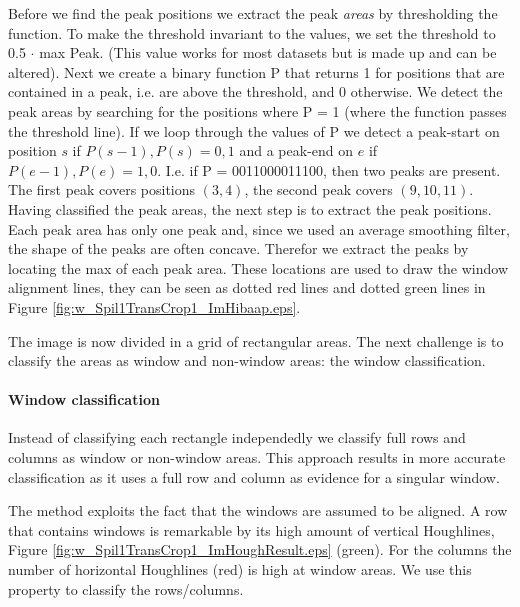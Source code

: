 Before we find the peak positions we extract the peak \emph{areas} by thresholding the
function. To make the threshold invariant to the values, we set the threshold to 0.5 $\cdot$ max Peak. 
(This value works for most datasets but is made up and can be altered).
Next we create a binary function P that returns 1 for positions that are contained in
a peak, i.e. are above the threshold, and 0 otherwise.
We detect the peak areas by searching for the positions where P = 1
(where the function passes the threshold line). 
If we loop through the values of P we detect a peak-start on position $s$ if ${P(s-1),P(s)}={0,1}$
and a peak-end on $e$ if ${P(e-1),P(e)}={1,0}$. 
I.e. if P = 0011000011100, then two peaks are present. The first peak covers positions $(3,4)$, 
the second peak covers $(9,10,11)$.\\

Having classified the peak areas, the next step is to extract the peak positions. 
Each peak area has only one peak and, since we used an average smoothing filter, the shape of 
the peaks are often concave. Therefor we extract the peaks by locating the max of each peak area. 
These locations are used to draw the window alignment lines, they can be seen
as dotted red lines and dotted green lines in Figure \ref{fig:w_Spil1TransCrop1_ImHibaap.eps}.

The image is now divided in a grid of rectangular areas. The next challenge is to 
classify the areas as window and non-window areas: the window classification.

\paragraph{Window classification}
Instead of classifying each rectangle independedly we classify full rows and
columns as window or non-window areas.  This approach results in more accurate
classification as it uses a full row and column as evidence for a singular
window. 

The method exploits the fact that the windows are assumed to be
aligned.
A row that contains windows is remarkable by its high amount of vertical
Houghlines, Figure \ref{fig:w_Spil1TransCrop1_ImHoughResult.eps}
(green). For the columns the number of horizontal Houghlines
 (red) is high at window areas.  We use this property to classify 
 the rows/columns. 

